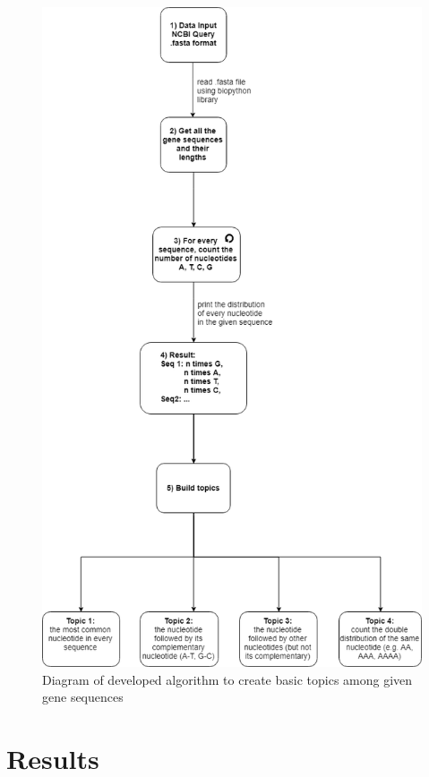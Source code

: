\begin{figure}[htbp]
	\centering
	\includegraphics[width=1\textwidth]{Image/creating_topics_algorithm.png}
	\caption{Diagram of developed algorithm to create basic topics among given gene sequences}
	\label{algorithm_figure}
\end{figure}

\section{Results}\label{results}


